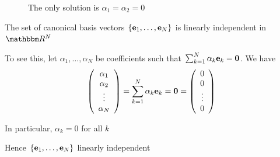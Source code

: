    \begin{frame}
        \begin{figure}
       \begin{center}
           \caption{\label{f:alpha_eq} The only solution is $\alpha_1 = \alpha_2 = 0$}
       \end{center}
    \end{figure}

\end{frame}

\begin{frame}
    
    \vspace{2em}
    \Eg The set of canonical basis vectors $\{{\mathbf e}_1, \ldots, {\mathbf e}_N\}$
    is linearly independent in $\RR^N$

    To see this, let $\alpha_1, \ldots, \alpha_N$ be coefficients such that
    $\sum_{k=1}^N \alpha_k {\mathbf e}_k = {\mathbf 0}$. We have
    \begin{equation*}
        \left(
        \begin{array}{c}
            \alpha_1 \\
            \alpha_2 \\
            \vdots \\
            \alpha_N
        \end{array}
        \right)
        = \sum_{k=1}^N \alpha_k {\mathbf e}_k 
        = {\mathbf 0}
        =
        \left(
        \begin{array}{c}
            0 \\
            0 \\
            \vdots \\
            0
        \end{array}
        \right)
    \end{equation*}

    In particular, $\alpha_k = 0$ for all $k$
    
    Hence  $\{{\mathbf e}_1, \ldots, {\mathbf e}_N\}$ linearly independent

\end{frame}

